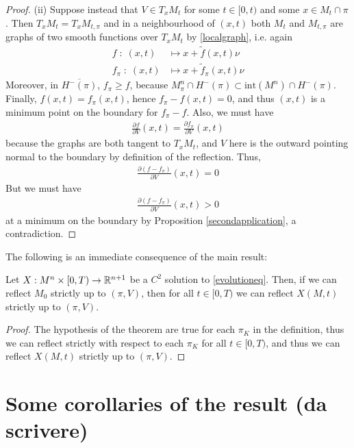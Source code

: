 \begin{proof}
	(ii) Suppose instead that $V\in T_xM_t$  for some $t\in [0, t)$ and some $x\in M_t\cap \pi$. Then $T_xM_t= T_xM_{t, \pi}$ and in a neighbourhood of $(x, t)$ both $M_t$ and $M_{t, \pi}$ are graphs of two smooth functions over $T_xM_t$ by \ref{localgraph}, i.e. again
	\begin{align*}
		f \; : \; (x, t) &\mapsto x+\tilde{f}(x, t)\nu \\
		f_\pi \; : \; (x, t) &\mapsto x+\tilde{f}_\pi(x, t)\nu 
	\end{align*} 
	Moreover, in $\overline{H^-(\pi)}$, $f_\pi\geq f$, because $M^n_\pi\cap H^-(\pi)\subset \mathrm{int}(M^n)\cap H^-(\pi)$. Finally, $f(x, t)=f_\pi (x, t)$, hence $f_\pi-f (x, t)=0$, and thus  $(x, t)$ is a minimum point on the boundary for $f_\pi-f$. Also, we must have
	\begin{align*}
		\frac{\partial f}{\partial V}(x,t)=\frac{\partial f_\pi}{\partial V}(x,t)
	\end{align*}
	because the graphs are both tangent to $T_xM_t$, and $V$ here is the outward pointing normal to the boundary by definition of the reflection. Thus, 
	\begin{align*}
		\frac{\partial (f- f_\pi)}{\partial V}(x,t)=0
	\end{align*}
	But we must have 
	\begin{align*}
		\frac{\partial (f- f_\pi)}{\partial V}(x,t)>0
	\end{align*}
	at a minimum on the boundary by Proposition \ref{secondapplication}, a contradiction.  
\end{proof}
The following is an immediate consequence of the main result:
\begin{cor}
	Let $X:M^n\times [0,T) \rightarrow \mathbb{R}^{n+1}$ be a $C^2$ solution to \ref{evolutioneq}. Then, if we can reflect $M_0$ strictly up to $(\pi, V)$, then for all $t\in [0,T)$ we can reflect $X(M, t)$ strictly up to $(\pi, V)$.  
\end{cor}
\begin{proof}
	The hypothesis of the theorem are true for each $\pi_K$ in the definition, thus we can reflect strictly with respect to each $\pi_K$ for all $t\in[0,T)$, and thus we can reflect $X(M, t)$ strictly up to $(\pi, V)$.
\end{proof}

\section{Some corollaries of the result (da scrivere)}


